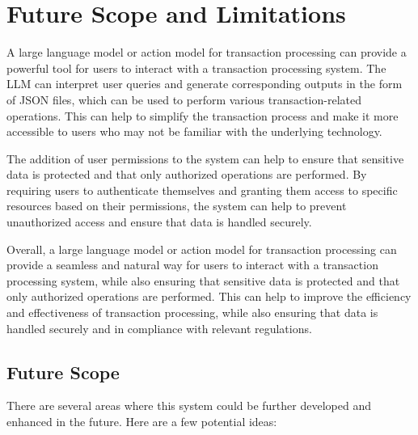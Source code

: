 \chapter{Future Scope and Limitations}

\noindent A large language model or action model for transaction processing can provide a powerful tool for users to interact with a transaction processing system. The LLM can interpret user queries and generate corresponding outputs in the form of JSON files, which can be used to perform various transaction-related operations. This can help to simplify the transaction process and make it more accessible to users who may not be familiar with the underlying technology.

\noindent The addition of user permissions to the system can help to ensure that sensitive data is protected and that only authorized operations are performed. By requiring users to authenticate themselves and granting them access to specific resources based on their permissions, the system can help to prevent unauthorized access and ensure that data is handled securely.

\noindent Overall, a large language model or action model for transaction processing can provide a seamless and natural way for users to interact with a transaction processing system, while also ensuring that sensitive data is protected and that only authorized operations are performed. This can help to improve the efficiency and effectiveness of transaction processing, while also ensuring that data is handled securely and in compliance with relevant regulations.

\clearpage
\section{Future Scope}

There are several areas where this system could be further developed and enhanced in the future. Here are a few potential ideas:

